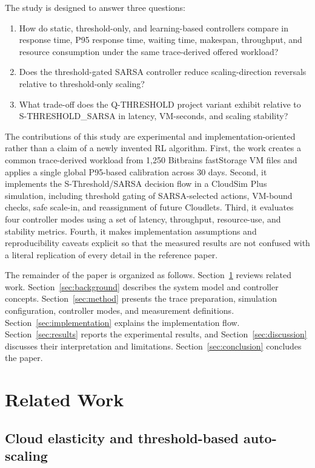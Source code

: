 \documentclass[pdflatex,sn-mathphys-num]{sn-jnl}
\begin{document}
The study is designed to answer three questions:
\begin{enumerate}[label=\textbf{RQ\arabic*.},leftmargin=2.0em]
  \item How do static, threshold-only, and learning-based controllers compare in response time, P95 response time, waiting time, makespan, throughput, and resource consumption under the same trace-derived offered workload?
  \item Does the threshold-gated SARSA controller reduce scaling-direction reversals relative to threshold-only scaling?
  \item What trade-off does the Q-THRESHOLD project variant exhibit relative to S-THRESHOLD\_SARSA in latency, VM-seconds, and scaling stability?
\end{enumerate}

The contributions of this study are experimental and implementation-oriented rather than a claim of a newly invented RL algorithm. First, the work creates a common trace-derived workload from 1,250 Bitbrains fastStorage VM files and applies a single global P95-based calibration across 30 days. Second, it implements the S-Threshold/SARSA decision flow in a CloudSim Plus simulation, including threshold gating of SARSA-selected actions, VM-bound checks, safe scale-in, and reassignment of future Cloudlets. Third, it evaluates four controller modes using a set of latency, throughput, resource-use, and stability metrics. Fourth, it makes implementation assumptions and reproducibility caveats explicit so that the measured results are not confused with a literal replication of every detail in the reference paper.

The remainder of the paper is organized as follows. Section~\ref{sec:related} reviews related work. Section~\ref{sec:background} describes the system model and controller concepts. Section~\ref{sec:method} presents the trace preparation, simulation configuration, controller modes, and measurement definitions. Section~\ref{sec:implementation} explains the implementation flow. Section~\ref{sec:results} reports the experimental results, and Section~\ref{sec:discussion} discusses their interpretation and limitations. Section~\ref{sec:conclusion} concludes the paper.

\section{Related Work}\label{sec:related}

\subsection{Cloud elasticity and threshold-based auto-scaling}
\end{document}
